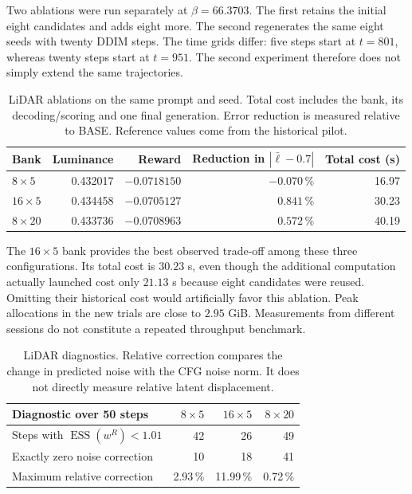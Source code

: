 \documentclass[11pt,a4paper]{article}
\newcommand{\ESS}{\operatorname{ESS}}
\begin{document}
Two ablations were run separately at $\beta=66.3703$. The first retains the initial eight candidates and adds eight more. The second regenerates the same eight seeds with twenty DDIM steps. The time grids differ: five steps start at $t=801$, whereas twenty steps start at $t=951$. The second experiment therefore does not simply extend the same trajectories.
\begin{table}[htbp]
\centering\small
\setlength{\tabcolsep}{4pt}
\begin{tabular}{lrrrr}
\toprule
Bank & Luminance & Reward & Reduction in $|\bar\ell-0.7|$ & Total cost (s)\\
\midrule
$8\times5$ & 0.432017 & $-0.0718150$ & $-0.070$\,\% & 16.97\\
$16\times5$ & 0.434458 & $-0.0705127$ & $0.841$\,\% & 30.23\\
$8\times20$ & 0.433736 & $-0.0708963$ & $0.572$\,\% & 40.19\\
\bottomrule
\end{tabular}
\caption{LiDAR ablations on the same prompt and seed. Total cost includes the bank, its decoding/scoring and one final generation. Error reduction is measured relative to BASE. Reference values come from the historical pilot.}
\label{tab:lidar}
\end{table}

The $16\times5$ bank provides the best observed trade-off among these three configurations. Its total cost is $30.23$ s, even though the additional computation actually launched cost only $21.13$ s because eight candidates were reused. Omitting their historical cost would artificially favor this ablation. Peak allocations in the new trials are close to $2.95$ GiB. Measurements from different sessions do not constitute a repeated throughput benchmark.

\begin{table}[htbp]
\centering\small
\begin{tabular}{lrrr}
\toprule
Diagnostic over 50 steps & $8\times5$ & $16\times5$ & $8\times20$\\
\midrule
Steps with $\ESS(w^R)<1.01$ & 42 & 26 & 49\\
Exactly zero noise correction & 10 & 18 & 41\\
Maximum relative correction & 2.93\,\% & 11.99\,\% & 0.72\,\%\\
\bottomrule
\end{tabular}
\caption{LiDAR diagnostics. Relative correction compares the change in predicted noise with the CFG noise norm. It does not directly measure relative latent displacement.}
\label{tab:ess}
\end{table}
\end{document}
